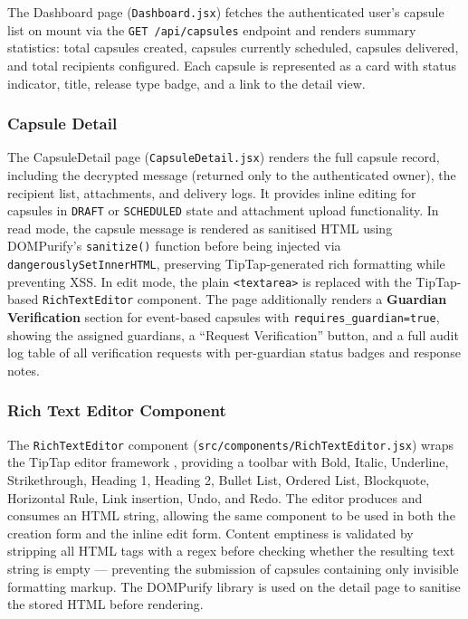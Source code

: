 \documentclass[12pt, a4paper]{article}
\begin{document}
The Dashboard page (\texttt{Dashboard.jsx}) fetches the authenticated user's capsule list on mount via the \texttt{GET /api/capsules} endpoint and renders summary statistics: total capsules created, capsules currently scheduled, capsules delivered, and total recipients configured. Each capsule is represented as a card with status indicator, title, release type badge, and a link to the detail view.

\subsubsection{Capsule Detail}

The CapsuleDetail page (\texttt{CapsuleDetail.jsx}) renders the full capsule record, including the decrypted message (returned only to the authenticated owner), the recipient list, attachments, and delivery logs. It provides inline editing for capsules in \texttt{DRAFT} or \texttt{SCHEDULED} state and attachment upload functionality. In read mode, the capsule message is rendered as sanitised HTML using DOMPurify's \texttt{sanitize()} function \cite{dompurify2024} before being injected via \texttt{dangerouslySetInnerHTML}, preserving TipTap-generated rich formatting while preventing XSS. In edit mode, the plain \texttt{<textarea>} is replaced with the TipTap-based \texttt{RichTextEditor} component. The page additionally renders a \textbf{Guardian Verification} section for event-based capsules with \texttt{requires\_guardian=true}, showing the assigned guardians, a ``Request Verification'' button, and a full audit log table of all verification requests with per-guardian status badges and response notes.

\subsubsection{Rich Text Editor Component}

The \texttt{RichTextEditor} component (\texttt{src/components/RichTextEditor.jsx}) wraps the TipTap editor framework \cite{tiptap2024}, providing a toolbar with Bold, Italic, Underline, Strikethrough, Heading 1, Heading 2, Bullet List, Ordered List, Blockquote, Horizontal Rule, Link insertion, Undo, and Redo. The editor produces and consumes an HTML string, allowing the same component to be used in both the creation form and the inline edit form. Content emptiness is validated by stripping all HTML tags with a regex before checking whether the resulting text string is empty — preventing the submission of capsules containing only invisible formatting markup. The DOMPurify library is used on the detail page to sanitise the stored HTML before rendering.
\end{document}
